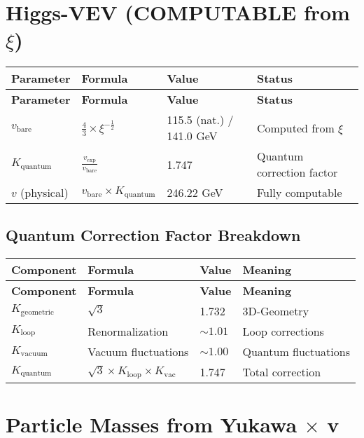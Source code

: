 \documentclass[12pt,a4paper]{article}
\begin{document}
	\section{Higgs-VEV (COMPUTABLE from \(\xi\))}
	
	\begin{longtable}{|p{3cm}|p{4cm}|p{3cm}|p{4cm}|}
		\hline
		\textbf{Parameter} & \textbf{Formula} & \textbf{Value} & \textbf{Status} \\
		\hline
		\endfirsthead
		\hline
		\textbf{Parameter} & \textbf{Formula} & \textbf{Value} & \textbf{Status} \\
		\hline
		\endhead
		\(v_{\text{bare}}\) & \(\frac{4}{3} \times \xi^{-\frac{1}{2}}\) & 115.5 (nat.) / 141.0 GeV & Computed from \(\xi\) \\
		\hline
		\(K_{\text{quantum}}\) & \(\frac{v_{\text{exp}}}{v_{\text{bare}}}\) & 1.747 & Quantum correction factor \\
		\hline
		\(v\) (physical) & \(v_{\text{bare}} \times K_{\text{quantum}}\) & 246.22 GeV & Fully computable \\
		\hline
	\end{longtable}
	
	\subsection{Quantum Correction Factor Breakdown}
	
	\begin{longtable}{|p{3cm}|p{4cm}|p{3cm}|p{4cm}|}
		\hline
		\textbf{Component} & \textbf{Formula} & \textbf{Value} & \textbf{Meaning} \\
		\hline
		\endfirsthead
		\hline
		\textbf{Component} & \textbf{Formula} & \textbf{Value} & \textbf{Meaning} \\
		\hline
		\endhead
		\(K_{\text{geometric}}\) & \(\sqrt{3}\) & 1.732 & 3D-Geometry \\
		\hline
		\(K_{\text{loop}}\) & Renormalization & \(\sim 1.01\) & Loop corrections \\
		\hline
		\(K_{\text{vacuum}}\) & Vacuum fluctuations & \(\sim 1.00\) & Quantum fluctuations \\
		\hline
		\(K_{\text{quantum}}\) & \(\sqrt{3} \times K_{\text{loop}} \times K_{\text{vac}}\) & 1.747 & Total correction \\
		\hline
	\end{longtable}
	
	\section{Particle Masses from Yukawa \(\times\) v}
	
\end{document}

